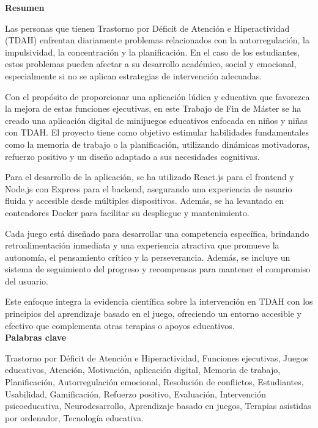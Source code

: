 \documentclass[10pt]{article}
\begin{document}
\textbf{Resumen}

Las personas que tienen Trastorno por Déficit de Atención e Hiperactividad (TDAH) enfrentan diariamente problemas relacionados con la autorregulación, la impulsividad, la concentración y la planificación. 
En el caso de los estudiantes, estos problemas pueden afectar a su desarrollo académico, social y emocional, especialmente si no se aplican estrategias de intervención adecuadas.

Con el propósito de proporcionar una aplicación lúdica y educativa que favorezca la mejora de estas funciones ejecutivas, en este Trabajo de Fin de Máster se ha creado una aplicación digital de minijuegos educativos enfocada en niños y niñas con TDAH. 
El proyecto tiene como objetivo estimular habilidades fundamentales como la memoria de trabajo o la planificación, utilizando dinámicas motivadoras, refuerzo positivo y un diseño adaptado a sus necesidades cognitivas.

Para el desarrollo de la aplicación, se ha utilizado React.js para el frontend y Node.js con Express para el backend, asegurando una experiencia de usuario fluida y accesible desde múltiples dispositivos. Además, se ha levantado en contendores Docker para facilitar su despliegue y mantenimiento.

Cada juego está diseñado para desarrollar una competencia específica, brindando retroalimentación inmediata y una experiencia atractiva que promueve la autonomía, el pensamiento crítico y la perseverancia. Además, se incluye un sistema de seguimiento del progreso y recompensas para mantener el compromiso del usuario.

Este enfoque integra la evidencia científica sobre la intervención en TDAH con los principios del aprendizaje basado en el juego, ofreciendo un entorno accesible y efectivo que complementa otras terapias o apoyos educativos.
\\

\textbf{Palabras clave}

Trastorno por Déficit de Atención e Hiperactividad, Funciones ejecutivas, Juegos educativos, Atención, Motivación, aplicación digital, Memoria de trabajo, Planificación, Autorregulación emocional, Resolución de conflictos, Estudiantes, Usabilidad, Gamificación, Refuerzo positivo, Evaluación, Intervención psicoeducativa, Neurodesarrollo, Aprendizaje basado en juegos, Terapias asistidas por ordenador, Tecnología educativa.

\newpage
\thispagestyle{empty}
\null
\newpage
\end{document}

